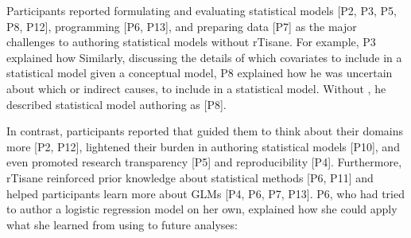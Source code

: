 

Participants reported formulating and evaluating statistical models [P2, P3, P5,
P8, P12], programming [P6, P13], and preparing data [P7] as the major challenges
to authoring statistical models without rTisane. For example, P3 explained how
 Similarly, discussing the details of
which covariates to include in a statistical model given a conceptual model, P8
explained how he was uncertain about which  or
indirect causes, to include in a statistical model. Without \rTisane, he
described statistical model authoring as  [P8].

In contrast, participants reported that \rTisane guided them to think about
their domains more [P2, P12], lightened their burden in authoring statistical
models [P10], and even promoted research transparency [P5] and reproducibility
[P4]. Furthermore, rTisane reinforced prior knowledge about statistical methods
[P6, P11] and helped participants learn more about GLMs [P4, P6, P7, P13]. P6,
who had tried to author a logistic regression model on her own, explained how
she could apply what she learned from using \rTisane to future analyses: 

